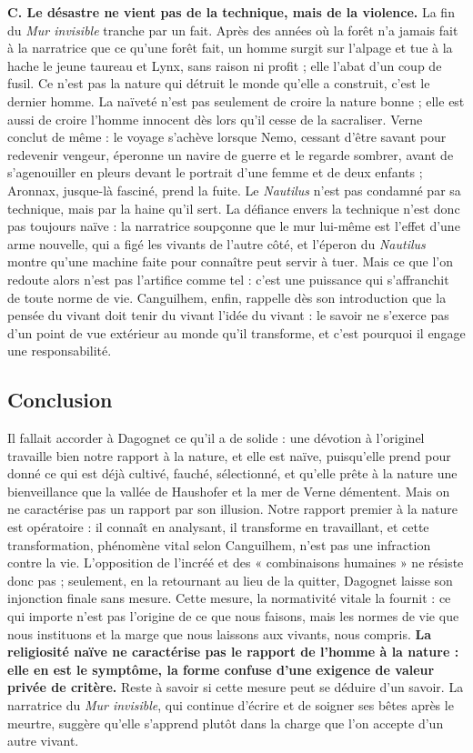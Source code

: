 \documentclass[11pt,a4paper]{article}
\begin{document}
\textbf{C. Le désastre ne vient pas de la technique, mais de la violence.} La fin du \emph{Mur invisible} tranche par un fait. Après des années où la forêt n'a jamais fait à la narratrice que ce qu'une forêt fait, un homme surgit sur l'alpage et tue à la hache le jeune taureau et Lynx, sans raison ni profit ; elle l'abat d'un coup de fusil. Ce n'est pas la nature qui détruit le monde qu'elle a construit, c'est le dernier homme. La naïveté n'est pas seulement de croire la nature bonne ; elle est aussi de croire l'homme innocent dès lors qu'il cesse de la sacraliser. Verne conclut de même : le voyage s'achève lorsque Nemo, cessant d'être savant pour redevenir vengeur, éperonne un navire de guerre et le regarde sombrer, avant de s'agenouiller en pleurs devant le portrait d'une femme et de deux enfants ; Aronnax, jusque-là fasciné, prend la fuite. Le \emph{Nautilus} n'est pas condamné par sa technique, mais par la haine qu'il sert. La défiance envers la technique n'est donc pas toujours naïve : la narratrice soupçonne que le mur lui-même est l'effet d'une arme nouvelle, qui a figé les vivants de l'autre côté, et l'éperon du \emph{Nautilus} montre qu'une machine faite pour connaître peut servir à tuer. Mais ce que l'on redoute alors n'est pas l'artifice comme tel : c'est une puissance qui s'affranchit de toute norme de vie. Canguilhem, enfin, rappelle dès son introduction que la pensée du vivant doit tenir du vivant l'idée du vivant : le savoir ne s'exerce pas d'un point de vue extérieur au monde qu'il transforme, et c'est pourquoi il engage une responsabilité.

\hypertarget{conclusion}{%
\subsection{Conclusion}\label{conclusion}}

Il fallait accorder à Dagognet ce qu'il a de solide : une dévotion à l'originel travaille bien notre rapport à la nature, et elle est naïve, puisqu'elle prend pour donné ce qui est déjà cultivé, fauché, sélectionné, et qu'elle prête à la nature une bienveillance que la vallée de Haushofer et la mer de Verne démentent. Mais on ne caractérise pas un rapport par son illusion. Notre rapport premier à la nature est opératoire : il connaît en analysant, il transforme en travaillant, et cette transformation, phénomène vital selon Canguilhem, n'est pas une infraction contre la vie. L'opposition de l'incréé et des « combinaisons humaines » ne résiste donc pas ; seulement, en la retournant au lieu de la quitter, Dagognet laisse son injonction finale sans mesure. Cette mesure, la normativité vitale la fournit : ce qui importe n'est pas l'origine de ce que nous faisons, mais les normes de vie que nous instituons et la marge que nous laissons aux vivants, nous compris. \textbf{La religiosité naïve ne caractérise pas le rapport de l'homme à la nature : elle en est le symptôme, la forme confuse d'une exigence de valeur privée de critère.} Reste à savoir si cette mesure peut se déduire d'un savoir. La narratrice du \emph{Mur invisible}, qui continue d'écrire et de soigner ses bêtes après le meurtre, suggère qu'elle s'apprend plutôt dans la charge que l'on accepte d'un autre vivant.
\end{document}
